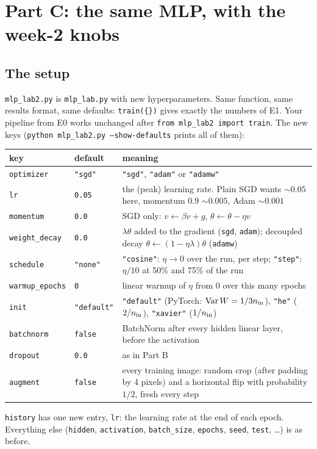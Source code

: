 \documentclass[11pt]{article}
\newcommand{\code}[1]{\texttt{#1}}
\begin{document}
\section*{Part C: the same MLP, with the week-2 knobs}
\subsection*{The setup}
\code{mlp\_lab2.py} is \code{mlp\_lab.py} with new hyperparameters. Same function, same results format, same defaults: \code{train(\{\})} gives exactly the numbers of E1. Your pipeline from E0 works unchanged after \code{from mlp\_lab2 import train}. The new keys (\code{python mlp\_lab2.py --show-defaults} prints all of them):
\begin{center}\small
\begin{tabular}{@{}llL{9.2cm}@{}}
\toprule
key & default & meaning \\
\midrule
\code{optimizer} & \code{"sgd"} & \code{"sgd"}, \code{"adam"} or \code{"adamw"} \\
\code{lr} & \code{0.05} & the (peak) learning rate. Plain SGD wants $\sim0.05$ here, momentum $0.9$ $\sim0.005$, Adam $\sim0.001$ \\
\code{momentum} & \code{0.0} & SGD only: $v\leftarrow\beta v+g$, $\theta\leftarrow\theta-\eta v$ \\
\code{weight\_decay} & \code{0.0} & $\lambda\theta$ added to the gradient (\code{sgd}, \code{adam}); decoupled decay $\theta\leftarrow(1-\eta\lambda)\theta$ (\code{adamw}) \\
\code{schedule} & \code{"none"} & \code{"cosine"}: $\eta\to0$ over the run, per step; \code{"step"}: $\eta/10$ at 50\% and 75\% of the run \\
\code{warmup\_epochs} & \code{0} & linear warmup of $\eta$ from $0$ over this many epochs \\
\code{init} & \code{"default"} & \code{"default"} (PyTorch: $\mathrm{Var}\,W=1/3n_{\rm in}$), \code{"he"} ($2/n_{\rm in}$), \code{"xavier"} ($1/n_{\rm in}$) \\
\code{batchnorm} & \code{false} & BatchNorm after every hidden linear layer, before the activation \\
\code{dropout} & \code{0.0} & as in Part B \\
\code{augment} & \code{false} & every training image: random crop (after padding by 4 pixels) and a horizontal flip with probability $1/2$, fresh every step \\
\bottomrule
\end{tabular}
\end{center}
\code{history} has one new entry, \code{lr}: the learning rate at the end of each epoch. Everything else (\code{hidden}, \code{activation}, \code{batch\_size}, \code{epochs}, \code{seed}, \code{test}, \dots) is as before.
\end{document}
